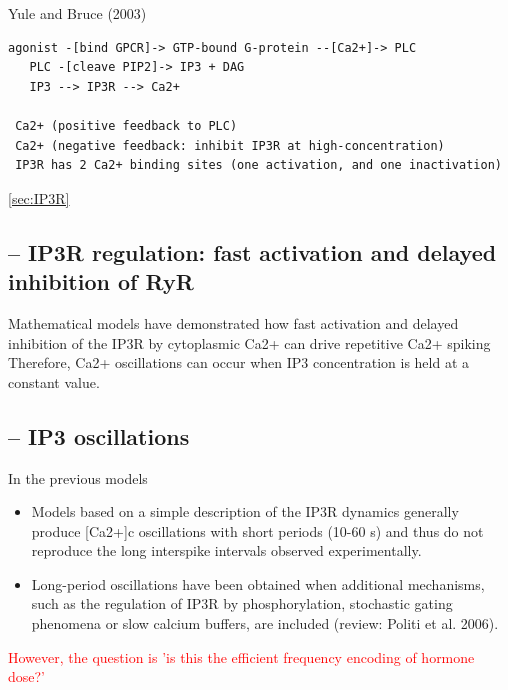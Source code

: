 % 
% 


Yule and Bruce (2003) 

\begin{verbatim}
agonist -[bind GPCR]-> GTP-bound G-protein --[Ca2+]-> PLC 
   PLC -[cleave PIP2]-> IP3 + DAG 
   IP3 --> IP3R --> Ca2+ 
    
 Ca2+ (positive feedback to PLC)
 Ca2+ (negative feedback: inhibit IP3R at high-concentration)
 IP3R has 2 Ca2+ binding sites (one activation, and one inactivation)
\end{verbatim}
\ref{sec:IP3R}

\subsection{-- IP3R regulation: fast activation and delayed inhibition of RyR}


Mathematical models have demonstrated how fast activation and delayed inhibition
of the IP3R by cytoplasmic Ca2+ can drive repetitive Ca2+ spiking
Therefore, Ca2+ oscillations can occur when IP3 concentration
is held at a constant value.


\subsection{-- IP3 oscillations }
\label{sec:calcium-oscillation-IP-oscilate}

In the previous models
\begin{itemize}
  \item Models based on a simple description of the IP3R dynamics generally produce
[Ca2+]c oscillations with short periods (10-60 s) and thus do not reproduce the
long interspike intervals observed experimentally.
  
  \item Long-period oscillations have been obtained when additional mechanisms, such as
the regulation of IP3R by phosphorylation, stochastic gating phenomena or slow
calcium buffers, are included (review: Politi et al. 2006). 

\end{itemize}
\textcolor{red}{However, the question is 'is this the efficient frequency
encoding of hormone dose?'}

